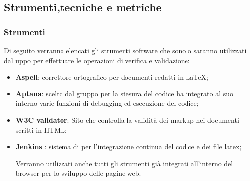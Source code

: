
\subsection{Strumenti,tecniche e metriche}

\subsubsection{Strumenti}

Di seguito verranno elencati gli strumenti software che sono o saranno utilizzati dal
uppo per effettuare le operazioni di verifica e validazione:
\begin{itemize}

\item \textbf{Aspell}: correttore ortografico per documenti redatti in \LaTeX;

\item \textbf{Aptana}: scelto dal gruppo per la stesura del codice ha integrato al suo interno varie funzioni di debugging ed esecuzione del codice;

\item \textbf{W3C validator}: Sito che controlla la validità dei markup nei documenti scritti in HTML;

\item \textbf{Jenkins} : sistema di per l'integrazione continua del codice e dei file latex;

Verranno utilizzati anche tutti gli strumenti già integrati all'interno del browser per lo sviluppo delle pagine web.

\end{itemize}
